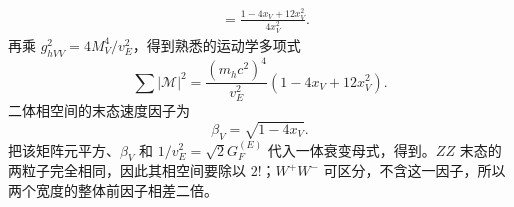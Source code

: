 \begin{derivation}
\begin{align*}
&=\frac{1-4x_V+12x_V^2}{4x_V^2}.
\end{align*}
再乘 $g_{hVV}^2=4M_V^4/v_E^2$，得到熟悉的运动学多项式
\begin{equation*}
\sum|\mathcal M|^2
=\frac{(m_hc^2)^4}{v_E^2}
\left(1-4x_V+12x_V^2\right).
\end{equation*}
二体相空间的末态速度因子为
\begin{equation*}
\beta_V=\sqrt{1-4x_V}.
\end{equation*}
把该矩阵元平方、$\beta_V$ 和 $1/v_E^2=\sqrt2G_F^{(E)}$ 代入一体衰变母式，得到。$ZZ$ 末态的两粒子完全相同，因此其相空间要除以 $2!$；$W^+W^-$ 可区分，不含这一因子，所以两个宽度的整体前因子相差二倍。
\end{derivation}
